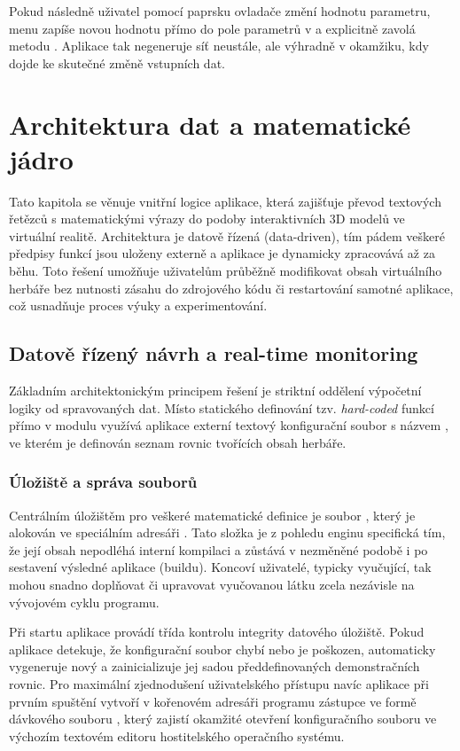 \documentclass[czech, kiv, sem, he, iso690alph, pdf,viewonly]{fasthesis}
\begin{document}
Pokud následně uživatel pomocí paprsku ovladače změní hodnotu parametru, menu zapíše novou hodnotu přímo do pole parametrů v  a explicitně zavolá metodu . 
Aplikace tak negeneruje síť neustále, ale výhradně v okamžiku, kdy dojde ke skutečné změně vstupních dat.

\chapter{Architektura dat a matematické jádro}
Tato kapitola se věnuje vnitřní logice aplikace, která zajišťuje převod textových řetězců s matematickými výrazy do podoby interaktivních 3D modelů ve virtuální realitě. 
Architektura je datově řízená (data-driven), tím pádem veškeré předpisy funkcí jsou uloženy externě a aplikace je dynamicky zpracovává až za běhu. 
Toto řešení umožňuje uživatelům průběžně modifikovat obsah virtuálního herbáře bez nutnosti zásahu do zdrojového kódu či restartování samotné aplikace, což usnadňuje proces výuky a experimentování.

\section{Datově řízený návrh a real-time monitoring}
Základním architektonickým principem řešení je striktní oddělení výpočetní logiky od spravovaných dat. 
Místo statického definování tzv. \textit{hard-coded} funkcí přímo v modulu  využívá aplikace externí textový konfigurační soubor s názvem , 
ve kterém je definován seznam rovnic tvořících obsah herbáře.

\subsection{Úložiště a správa souborů}
Centrálním úložištěm pro veškeré matematické definice je soubor , který je alokován ve speciálním adresáři . 
Tato složka je z pohledu enginu  specifická tím, že její obsah nepodléhá interní kompilaci a zůstává v nezměněné podobě i po sestavení výsledné aplikace (buildu). 
Koncoví uživatelé, typicky vyučující, tak mohou snadno doplňovat či upravovat vyučovanou látku zcela nezávisle na vývojovém cyklu programu.

Při startu aplikace provádí třída  kontrolu integrity datového úložiště. Pokud aplikace detekuje, že konfigurační soubor chybí nebo je poškozen, 
automaticky vygeneruje nový a zainicializuje jej sadou předdefinovaných demonstračních rovnic. 
Pro maximální zjednodušení uživatelského přístupu navíc aplikace při prvním spuštění vytvoří v kořenovém adresáři programu zástupce ve formě dávkového souboru , 
který zajistí okamžité otevření konfiguračního souboru ve výchozím textovém editoru hostitelského operačního systému.
\end{document}
